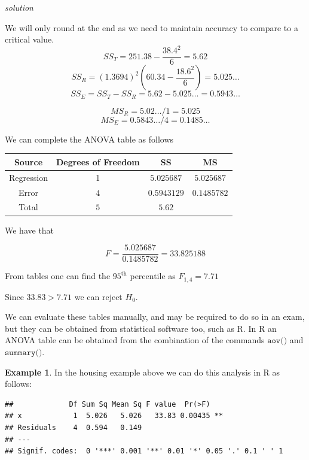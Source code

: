 \documentclass[
]{book}
\newenvironment{Shaded}{\begin{snugshade}}{\end{snugshade}}
\newcommand{\FloatTok}[1]{\textcolor[rgb]{0.00,0.00,0.81}{#1}}
\newcommand{\KeywordTok}[1]{\textcolor[rgb]{0.13,0.29,0.53}{\textbf{#1}}}
\newcommand{\NormalTok}[1]{#1}
\newcommand{\OperatorTok}[1]{\textcolor[rgb]{0.81,0.36,0.00}{\textbf{#1}}}
\newcommand{\StringTok}[1]{\textcolor[rgb]{0.31,0.60,0.02}{#1}}
\theoremstyle{definition}
\theoremstyle{definition}
\newtheorem{example}{Example}[chapter]
\theoremstyle{definition}
\theoremstyle{definition}
\theoremstyle{remark}
\begin{document}
\emph{solution}

We will only round at the end as we need to maintain accuracy to compare to a critical value.
\[SS_T = 251.38 - \frac{38.4^2}{6} = 5.62\]
\[SS_R = (1.3694)^2 \left( 60.34 - \frac{18.6^2}{6} \right) = 5.025\ldots\]
\[SS_E = SS_T - SS_R = 5.62 - 5.025\ldots = 0.5943\ldots \]

\[MS_R = 5.02\ldots /1 = 5.025 \]
\[MS_E = 0.5843\ldots / 4 = 0.1485\ldots\]

We can complete the ANOVA table as follows

\begin{longtable}[]{@{}cccc@{}}
\toprule
Source & Degrees of Freedom & SS & MS\tabularnewline
\midrule
\endhead
Regression & 1 & \(5.025687\) & \(5.025687\)\tabularnewline
Error & \(4\) & \(0.5943129\) & \(0.1485782\)\tabularnewline
Total & \(5\) & \(5.62\) &\tabularnewline
\bottomrule
\end{longtable}

We have that

\[F = \frac{5.025687}{0.1485782}=33.825188\]

From tables one can find the \(95^{\text{th}}\) percentile as \(F_{1,4}=7.71\)

Since \(33.83 > 7.71\) we can reject \(H_0\).

We can evaluate these tables manually, and may be required to do so in an exam, but they can be obtained from statistical software too, such as R. In R an ANOVA table can be obtained from the combination of the commands \(\texttt{aov()}\) and \(\texttt{summary()}\).

\begin{example}

In the housing example above we can do this analysis in R as follows:

\begin{Shaded}
\end{Shaded}

\begin{verbatim}
##             Df Sum Sq Mean Sq F value  Pr(>F)   
## x            1  5.026   5.026   33.83 0.00435 **
## Residuals    4  0.594   0.149                   
## ---
## Signif. codes:  0 '***' 0.001 '**' 0.01 '*' 0.05 '.' 0.1 ' ' 1
\end{verbatim}

\end{example}
\end{document}
